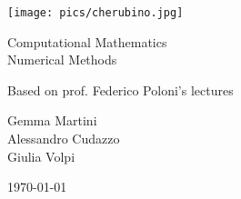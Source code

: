 \documentclass[computational_mathematics.tex]{subfiles}
\begin{document}
\begin{titlepage}
    \begin{center}
    \vspace{3cm}
    
    \Large
    
    \vspace{2cm}
    
    \texttt{[image: pics/cherubino.jpg]}
    
    \vspace{2.5cm}
    
    {\Huge \sc Computational Mathematics\\ Numerical Methods}
    
    \vspace{2cm}
    Based on prof. Federico Poloni's lectures
    
    \vspace{2cm}
    Gemma Martini\\ Alessandro Cudazzo\\ Giulia Volpi
    \vfill
    
    \today
    
    \end{center}
\end{titlepage}

\shipout\null

\tableofcontents
\let\tableofcontents\relax

\newpage



\newpage



\newpage



\newpage



\newpage



\newpage



\newpage



\newpage



\newpage



\newpage



\newpage



\newpage



\newpage



\newpage



\newpage



\newpage


\end{document}
